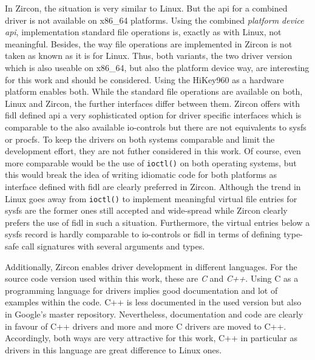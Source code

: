 In Zircon, the situation is very similar to Linux.
But the \ac{api} for a combined driver is not available on x86\_64 platforms.
Using the combined \textit{platform device \ac{api}}, implementation standard file operations is, exactly as with Linux, not meaningful.
Besides, the way file operations are implemented in Zircon is not taken as known as it is for Linux.
Thus, both variants, the two driver version which is also useable on x86\_64, but also the platform device way, are interesting for this work and should be considered.
Using the HiKey960 as a hardware platform enables both.
While the standard file operations are available on both, Linux and Zircon, the further interfaces differ between them.
Zircon offers with \ac{fidl} defined \acs{api} a very sophisticated option for driver specific interfaces which is comparable to the also available \ac{io}-controls but there are not equivalents to sysfs or procfs.
To keep the drivers on both systems comparable and limit the development effort, they are not futher considered in this work.
Of course, even more comparable would be the use of \texttt{ioctl()} on both operating systems, but this would break the idea of writing idiomatic code for both platforms as interface defined with \ac{fidl} are clearly preferred in Zircon.
Although the trend in Linux goes away from \texttt{ioctl()} to implement meaningful virtual file entries for sysfs are the former ones still accepted and wide-spread while Zircon clearly prefers the use of \ac{fidl} in such a situation.
Furthermore, the virtual entries below a sysfs record is hardly comparable to \ac{io}-controls or \ac{fidl} in terms of defining type-safe call signatures with several arguments and types.

Additionally, Zircon enables driver development in different languages.
For the source code version used within this work, these are \textit{C} and \textit{C++}.
Using C as a programming language for drivers implies good documentation and lot of examples within the code.
C++ is less documented in the used version but also in Google's master repository.
Nevertheless, documentation and code are clearly in favour of C++ drivers and more and more C drivers are moved to C++.
Accordingly, both ways are very attractive for this work, C++ in particular as drivers in this language are great difference to Linux ones.

